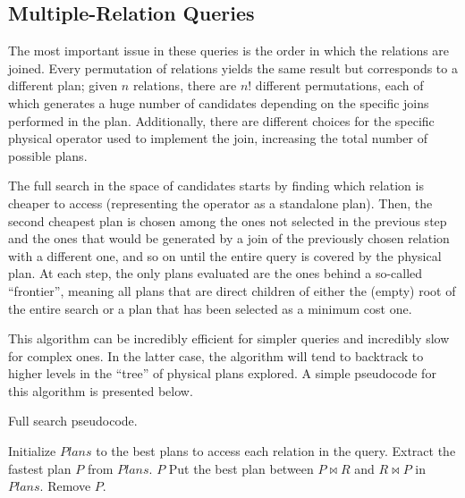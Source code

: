 \subsection{Multiple-Relation Queries}

The most important issue in these queries is the order in which the relations are joined. Every permutation of relations yields the same result but corresponds to a different plan; given $n$ relations, there are $n!$ different permutations, each of which generates a huge number of candidates depending on the specific joins performed in the plan. Additionally, there are different choices for the specific physical operator used to implement the join, increasing the total number of possible plans.

The full search in the space of candidates starts by finding which relation is cheaper to access (representing the operator as a standalone plan). Then, the second cheapest plan is chosen among the ones not selected in the previous step and the ones that would be generated by a join of the previously chosen relation with a different one, and so on until the entire query is covered by the physical plan. At each step, the only plans evaluated are the ones behind a so-called ``frontier'', meaning all plans that are direct children of either the (empty) root of the entire search or a plan that has been selected as a minimum cost one.

This algorithm can be incredibly efficient for simpler queries and incredibly slow for complex ones. In the latter case, the algorithm will tend to backtrack to higher levels in the ``tree'' of physical plans explored. A simple pseudocode for this algorithm is presented below.

\begin{algorithm}
\caption{Full search pseudocode.}
\begin{algorithmic}[1]
    \State Initialize $Plans$ to the best plans to access each relation in the query.
    \Loop
        \State Extract the fastest plan $P$ from $Plans$.
            \State \Return $P$
        \EndIf
            \State Put the best plan between $P \bowtie R$ and $R \bowtie P$ in $Plans$.
        \EndFor
        \State Remove $P$.
    \EndLoop
\end{algorithmic}
\end{algorithm}

